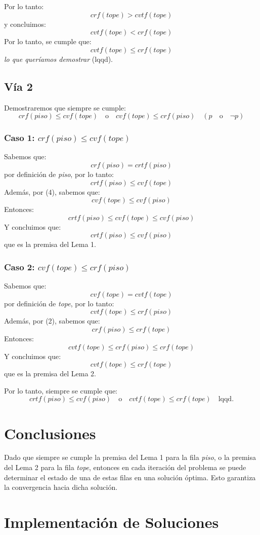 \documentclass[a4paper,12pt]{article}
\begin{document}
Por lo tanto:
\[
crf(tope) > cvtf(tope)
\]
y concluimos:
\[
cvtf(tope) < crf(tope)
\]
Por lo tanto, se cumple que:
\[
cvtf(tope) \leq crf(tope)
\]
\textit{lo que queríamos demostrar} (lqqd).
\subsection{Vía 2}

Demostraremos que siempre se cumple:
\[
crf(piso) \leq cvf(tope) \quad \text{o} \quad cvf(tope) \leq crf(piso) \quad (p \quad \text{o} \quad \neg p)
\]

\subsubsection{Caso 1: $crf(piso) \leq cvf(tope)$}

Sabemos que:
\[
crf(piso) = crtf(piso)
\]
por definición de \textit{piso}, por lo tanto:
\[
crtf(piso) \leq cvf(tope)
\]
Además, por (4), sabemos que:
\[
cvf(tope) \leq cvf(piso)
\]
Entonces:
\[
crtf(piso) \leq cvf(tope) \leq cvf(piso)
\]
Y concluimos que:
\[
crtf(piso) \leq cvf(piso)
\]
que es la premisa del Lema 1.

\subsubsection{Caso 2: $cvf(tope) \leq crf(piso)$}

Sabemos que:
\[
cvf(tope) = cvtf(tope)
\]
por definición de \textit{tope}, por lo tanto:
\[
cvtf(tope) \leq crf(piso)
\]
Además, por (2), sabemos que:
\[
crf(piso) \leq crf(tope)
\]
Entonces:
\[
cvtf(tope) \leq crf(piso) \leq crf(tope)
\]
Y concluimos que:
\[
cvtf(tope) \leq crf(tope)
\]
que es la premisa del Lema 2.

Por lo tanto, siempre se cumple que:
\[
crtf(piso) \leq cvf(piso) \quad \text{o} \quad cvtf(tope) \leq crf(tope) \quad \text{lqqd}.
\]

\section{Conclusiones}
Dado que siempre se cumple la premisa del Lema 1 para la fila \textit{piso}, o la premisa del Lema 2 para la fila \textit{tope}, entonces en cada iteración del problema se puede determinar el estado de una de estas filas en una solución óptima. Esto garantiza la convergencia hacia dicha solución.

\section{Implementación de Soluciones}
\end{document}
